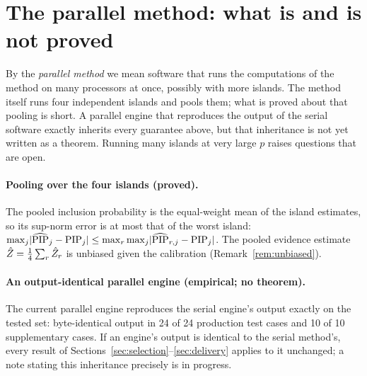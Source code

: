 \section{The parallel method: what is and is not proved}\label{sec:parallel}

By the \emph{parallel method} we mean software that runs the computations of the method on many processors at once,
possibly with more islands. The method itself runs four independent islands and pools them; what is proved about that
pooling is short. A parallel engine that reproduces the output of the serial software exactly inherits every guarantee
above, but that inheritance is not yet written as a
theorem. Running many islands at very large $p$ raises questions that are open.

\paragraph{Pooling over the four islands (proved).} The pooled inclusion probability is the equal-weight mean of the
island estimates, so its sup-norm error is at most that of the worst island:
$\max_j\lvert \widehat{\mathrm{PIP}}_j-\mathrm{PIP}_j\rvert\le\max_r\max_j\lvert \widehat{\mathrm{PIP}}_{r,j}-\mathrm{PIP}_j\rvert$. The pooled evidence estimate
$\hat Z=\frac14\sum_r\hat Z_r$ is unbiased given the calibration (Remark~\ref{rem:unbiased}).


\paragraph{An output-identical parallel engine (empirical; no theorem).} The current parallel engine reproduces the serial
engine's output exactly on the tested set: byte-identical output in 24 of 24 production test cases and 10 of 10
supplementary cases. If an engine's output is identical to the serial method's, every result of
Sections~\ref{sec:selection}--\ref{sec:delivery} applies to it unchanged; a note stating this inheritance precisely is in
progress.


